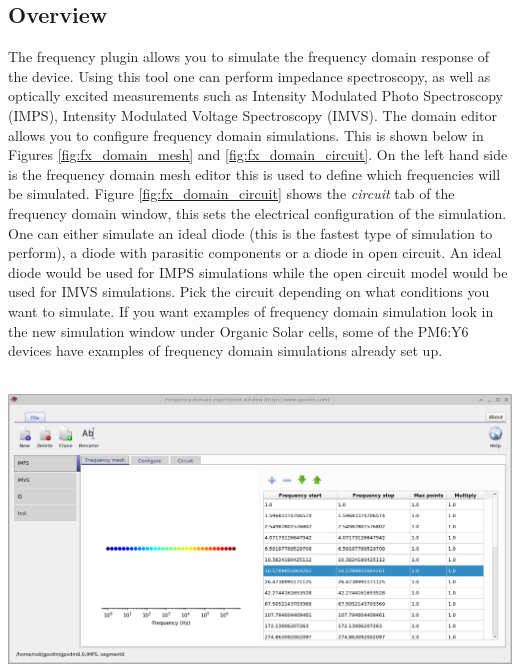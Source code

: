 \subsection{Overview}
The frequency plugin allows you to simulate the frequency domain response of the device.  Using this tool one can perform impedance spectroscopy, as well as optically excited measurements such as Intensity Modulated Photo Spectroscopy (IMPS), Intensity Modulated Voltage Spectroscopy (IMVS). The  domain editor allows you to configure frequency domain simulations. This is shown below in Figures \ref{fig:fx_domain_mesh} and \ref{fig:fx_domain_circuit}. On the left hand side is the frequency domain mesh editor this is used to define which frequencies will be simulated.  Figure \ref{fig:fx_domain_circuit} shows the \emph{circuit} tab of the frequency domain window, this sets the electrical configuration of the simulation. One can either simulate an ideal diode (this is the fastest type of simulation to perform), a diode with parasitic components or a diode in open circuit. An ideal diode would be used for IMPS simulations while the open circuit model would be used for IMVS simulations. Pick the circuit depending on what conditions you want to simulate. If you want examples of frequency domain simulation look in the new simulation window under Organic Solar cells, some of the PM6:Y6 devices have examples of frequency domain simulations already set up.
\\
\\
\noindent
\begin{minipage}{0.5\textwidth}
	\centering
	\includegraphics[width=\linewidth,height=0.8\linewidth]{./images/sim_editors/fx_domain_editor.png}
	\label{fig:fx_domain_mesh}
\end{minipage}
